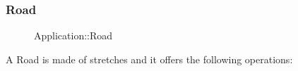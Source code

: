 \subsubsection{Road}
\begin{figure}[h]
\centering
{}
\caption{Application::Road}
\end{figure}
\FloatBarrier
A Road is made of stretches and it offers the following operations:
